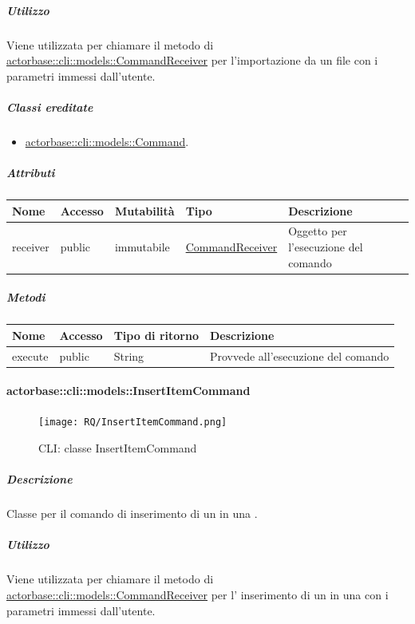 \documentclass{scalatekids-article}
\begin{document}
\subparagraph{Utilizzo}

Viene utilizzata per chiamare il metodo di
\hyperref[sec:actorbase::cli::models::CommandReceiver]{actorbase::cli::models::CommandReceiver} per l'importazione da un file
 con i parametri immessi dall'utente.

\subparagraph{Classi ereditate}

\begin{itemize}
\item \hyperref[sec:actorbase::cli::models::Command]{actorbase::cli::models::Command}.
\end{itemize}

\subparagraph{Attributi}
\begin{tabular}{| p{1cm} | p{1.5cm} | p{2cm} | p{4cm} | p{8.5cm} |}
  \hline
  Nome & Accesso & Mutabilità & Tipo & Descrizione\\
  \hline
  receiver & public & immutabile & \hyperref[sec:actorbase::cli::models::CommandReceiver]{CommandReceiver} & Oggetto per l'esecuzione del comando\\
  \hline
\end{tabular}

\subparagraph{Metodi}

\begin{tabular}{| l | l | l | l |}
  \hline
  Nome & Accesso & Tipo di ritorno & Descrizione\\
  \hline
  execute & public & String & Provvede all'esecuzione del comando\\
  \hline
\end{tabular}

\paragraph{actorbase::cli::models::InsertItemCommand}
\label{sec:actorbase::cli::models::InsertItemCommand}

\begin{figure}[H]
  \begin{center}
    \texttt{[image: RQ/InsertItemCommand.png]}
    \caption{CLI: classe InsertItemCommand}
  \end{center}
\end{figure}

\subparagraph{Descrizione}

Classe per il comando di inserimento di un  in una
.

\subparagraph{Utilizzo}

Viene utilizzata per chiamare il metodo di \hyperref[sec:actorbase::cli::models::CommandReceiver]{actorbase::cli::models::CommandReceiver} per l' inserimento di un  in una  con i parametri immessi dall'utente.
\end{document}
